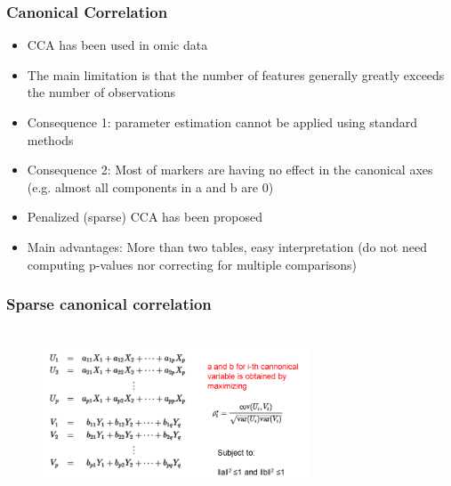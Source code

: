 \documentclass[10pt,xcolor=dvipsnames]{beamer}\usepackage[]{graphicx}\usepackage[]{color}
\begin{document}
\begin{frame}[plain]\frametitle{Canonical Correlation}

\begin{itemize}
\item CCA has been used in omic data
\item The main limitation is that the number of features generally greatly exceeds the number of observations
\item Consequence 1: parameter estimation cannot be applied using standard methods
\item  Consequence 2: Most of markers are having no effect in the canonical axes (e.g. almost all components in a and b are 0)
\item Penalized (sparse) CCA has been proposed
\item Main advantages: More than two tables, easy interpretation (do not need computing p-values nor correcting for multiple comparisons)
\end{itemize}

\end{frame}



\begin{frame}[plain]\frametitle{Sparse canonical correlation}

\begin{figure}
\begin{center}
 \includegraphics[height=5cm, width=8cm]{figures/mCCA.png}
\end{center}
\end{figure}

\end{frame}
\end{document}

